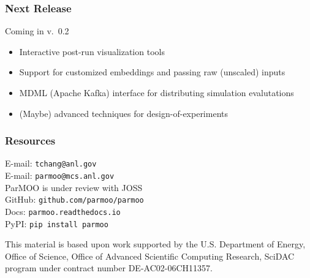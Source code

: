 \documentclass[aspectratio=169]{beamer}
\begin{document}
\begin{frame}\frametitle{Next Release}

Coming in v.~0.2
\begin{itemize}
\item Interactive post-run visualization tools
\item Support for customized embeddings and passing raw (unscaled) inputs
\item MDML (Apache Kafka) interface for distributing simulation evalutations
\item (Maybe) advanced techniques for design-of-experiments
\end{itemize}
\end{frame}

\begin{frame}\frametitle{Resources}
\begin{center}
{\large
E-mail: {\tt tchang@anl.gov}\\
E-mail: {\tt parmoo@mcs.anl.gov}\\
\bigskip
\bigskip
ParMOO is under review with JOSS\\
\bigskip
\bigskip
GitHub: {\tt github.com/parmoo/parmoo}\\
Docs: {\tt parmoo.readthedocs.io}\\
PyPI: {\tt pip install parmoo}}

\bigskip
\bigskip

{\small This material is based upon work supported by the U.S. Department of Energy, Office of Science, Office of Advanced Scientific Computing Research, SciDAC program under contract number DE-AC02-06CH11357.}
\end{center}
\end{frame}
\end{document}
